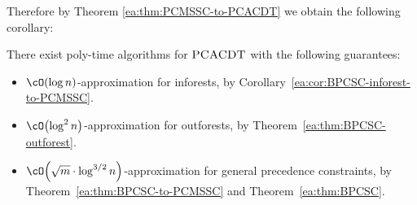 
Therefore by Theorem \ref{ea:thm:PCMSSC-to-PCACDT} we obtain the following corollary:

\begin{corollary}\label{ea:cor:PCACDT-special-cases}
    There exist poly-time algorithms for $\textup{\textsc{PCACDT}}$ with the following guarantees:
    \begin{itemize}
        \item $\cO\br{\log n}$-approximation for inforests, by Corollary~\ref{ea:cor:BPCSC-inforest-to-PCMSSC}.
        \item $\cO\br{\log^2 n}$-approximation for outforests, by Theorem~\ref{ea:thm:BPCSC-outforest}.
        \item $\cO\br{\sqrt{m}\cdot\log^{3/2} n}$-approximation for general precedence constraints, by Theorem~\ref{ea:thm:BPCSC-to-PCMSSC} and Theorem~\ref{ea:thm:BPCSC}.
    \end{itemize}
\end{corollary}
